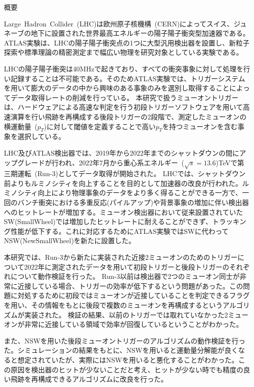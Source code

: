 \begin{center}
  \begin{huge}
    概要
  \end{huge}
\end{center}

\vspace{10pt}

Large~Hadron~Collider~(LHC)は欧州原子核機構~(CERN)によってスイス、ジュネーブの地下に設置された世界最高エネルギーの陽子陽子衝突型加速器である。ATLAS実験は、LHCの陽子陽子衝突点の1つに大型汎用検出器を設置し、新粒子探索や標準理論の精密測定まで幅広い物理を研究対象としている実験である。


LHCの陽子陽子衝突は40MHzで起きており、すべての衝突事象に対して処理を行い記録することは不可能である。そのためATLAS実験では、トリガーシステムを用いて膨大のデータの中から興味のある事象のみを選別し取得することによってデータ取得レートの削減を行っている。
本研究で扱うミューオントリガーは、ハードウェアによる高速な判定を行う初段トリガーソフトウェアを用いて高速演算を行い飛跡を再構成する後段トリガーの2段階で、測定したミューオンの横運動量~($p_{T}$)に対して閾値を定義することで高い$p_{T}$を持つミューオンを含む事象を選択している。


LHC及びATLAS検出器では、2019年から2022年までのシャットダウンの間にアップグレードが行われ、2022年7月から重心系エネルギー~($\sqrt{s}=13.6$)TeVで第三期運転~(Run-3)としてデータ取得が開始された。
LHCでは、シャットダウン前よりもルミノシティを向上することを目的として加速器の改良が行われた。ルミノシティ向上により物理事象のデータをより多く得ることができる一方で、一回のバンチ衝突における多重反応(パイルアップ)や背景事象の増加に伴い検出器へのヒットレートが増加する。ミューオン検出器において従来設置されていたSW(SmallWheel)では増加したヒットレートに耐えることができず、トラッキング性能が低下する。これに対応するためにATLAS実験ではSWに代わってNSW(NewSmallWheel)を新たに設置した。

本研究では、Run-3から新たに実装された近接2ミューオンのためのトリガーについて2022年に測定されたデータを用いて初段トリガーと後段トリガーのそれぞれについて動作検証を行った。
Run-3以前は検出器で2つのミューオン同士が非常に近接している場合、トリガーの効率が低下するという問題があった。この問題に対処するために初段ではミューオンが近接していることを判定できるフラグを用い、その情報をもとに後段で複数のミューオンを再構成するというアルゴリズムが実装された。
検証の結果、以前のトリガーでは取れていなかった2ミューオンが非常に近接している領域で効率が回復しているということがわかった。


また、NSWを用いた後段ミューオントリガーのアルゴリズムの動作検証を行った。シミュレーションの結果をもとに、NSWを用いると運動量分解能が良くなると想定されていたが、実際にはNSWを用いると悪化することがわかった。この原因を検出器のヒットが少ないことだと考え、ヒットが少ない時でも精度の良い飛跡を再構成できるアルゴリズムに改良を行った。